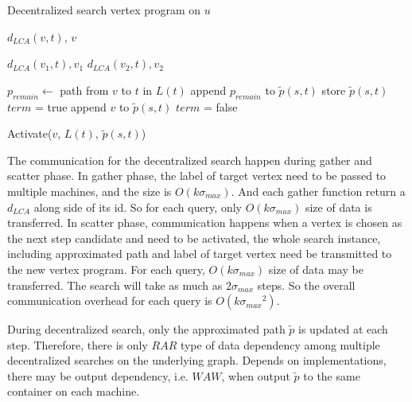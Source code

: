 \begin{algorithm}
    \caption{Decentralized search vertex program on $u$}
		\label{alg:vc_dec}
    \begin{algorithmic}
						\State \Return $d_{LCA}(v, t)$, $v$
				\EndFunction

								\State \Return $d_{LCA}(v_1,t), v_1$
						\Else
								\State \Return $d_{LCA}(v_2,t), v_2$
						\EndIf
				\EndFunction

								\State $p_{remain} \gets$ path from $v$ to $t$ in $L(t)$
								\State append $p_{remain}$ to $\tilde{p}(s,t)$
								\State store $\tilde{p}(s,t)$
								\State $term$ = true
						\Else
								\State append $v$ to $\tilde{p}(s,t)$
								\State $term$ = false
						\EndIf
				\EndFunction

						\If {$\neg term$}
								\State Activate($v$, $L(t)$, $\tilde{p}(s,t)$)
						\EndIf
        \EndFunction
    \end{algorithmic}
\end{algorithm}

The communication for the decentralized search happen during gather and scatter phase. In gather phase, the label of target vertex need to be passed to multiple machines, and the size is $O(k{\sigma}_{max})$. And each gather function return a $d_{LCA}$ along side of its id. So for each query, only $O(k{\sigma}_{max})$ size of data is transferred. In scatter phase, communication happens when a vertex is chosen as the next step candidate and need to be activated, the whole search instance, including approximated path and label of target vertex need be transmitted to the new vertex program. For each query, $O(k{\sigma}_{max})$ size of data may be transferred. The search will take as much as $2{\sigma}_{max}$ steps. So the overall communication overhead for each query is $O(k{{\sigma}_{max}}^2)$. 

During decentralized search, only the approximated path $\tilde{p}$ is updated at each step. Therefore, there is only $RAR$ type of data dependency among multiple decentralized searches on the underlying graph. Depends on implementations, there may be output dependency, i.e. $WAW$, when output $\tilde{p}$ to the same container on each machine.

